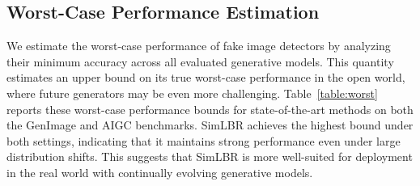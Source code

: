 \subsection{Worst-Case Performance Estimation}
We estimate the worst-case performance of fake image detectors by analyzing their minimum accuracy across all evaluated generative models. This quantity estimates an upper bound on its true worst-case performance in the open world, where future generators may be even more challenging. Table~\ref{table:worst} reports these worst-case performance bounds for state-of-the-art methods on both the GenImage and AIGC benchmarks. SimLBR achieves the highest bound under both settings, indicating that it maintains strong performance even under large distribution shifts. This suggests that SimLBR is more well-suited for deployment in the real world with continually evolving generative models.



